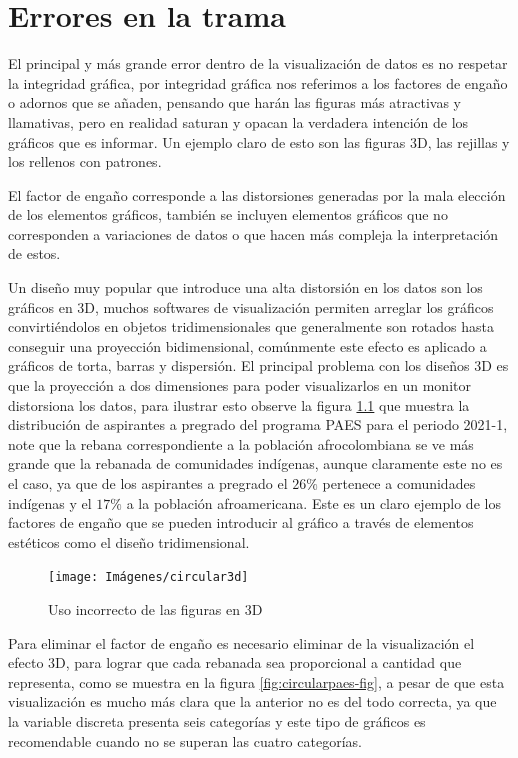 \documentclass[
]{book}
\begin{document}
\hypertarget{errores-en-la-trama}{%
\chapter{Errores en la trama}\label{errores-en-la-trama}}

El principal y más grande error dentro de la visualización de datos es no respetar la integridad gráfica, por integridad gráfica nos referimos a los factores de engaño o adornos que se añaden, pensando que harán las figuras más atractivas y llamativas, pero en realidad saturan y opacan la verdadera intención de los gráficos que es informar. Un ejemplo claro de esto son las figuras 3D, las rejillas y los rellenos con patrones.

El factor de engaño corresponde a las distorsiones generadas por la mala elección de los elementos gráficos, también se incluyen elementos gráficos que no corresponden a variaciones de datos o que hacen más compleja la interpretación de estos.

Un diseño muy popular que introduce una alta distorsión en los datos son los gráficos en 3D, muchos softwares de visualización permiten arreglar los gráficos convirtiéndolos en objetos tridimensionales que generalmente son rotados hasta conseguir una proyección bidimensional, comúnmente este efecto es aplicado a gráficos de torta, barras y dispersión. El principal problema con los diseños 3D es que la proyección a dos dimensiones para poder visualizarlos en un monitor distorsiona los datos, para ilustrar esto observe la figura \ref{fig:circular3d-fig} que muestra la distribución de aspirantes a pregrado del programa PAES para el periodo 2021-1, note que la rebana correspondiente a la población afrocolombiana se ve más grande que la rebanada de comunidades indígenas, aunque claramente este no es el caso, ya que de los aspirantes a pregrado el \(26\%\) pertenece a comunidades indígenas y el \(17\%\) a la población afroamericana. Este es un claro ejemplo de los factores de engaño que se pueden introducir al gráfico a través de elementos estéticos como el diseño tridimensional.

\begin{figure}

{\centering \texttt{[image: Imágenes/circular3d]} 

}

\caption{Uso incorrecto de las figuras en 3D}\label{fig:circular3d-fig}
\end{figure}

Para eliminar el factor de engaño es necesario eliminar de la visualización el efecto 3D, para lograr que cada rebanada sea proporcional a cantidad que representa, como se muestra en la figura \ref{fig:circularpaes-fig}, a pesar de que esta visualización es mucho más clara que la anterior no es del todo correcta, ya que la variable discreta presenta seis categorías y este tipo de gráficos es recomendable cuando no se superan las cuatro categorías.
\end{document}
